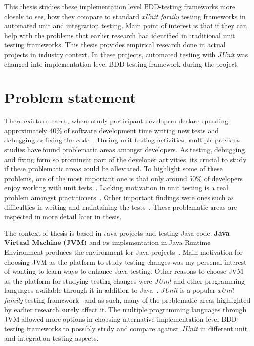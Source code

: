 This thesis studies these implementation level BDD-testing frameworks more closely to see, how they compare to
standard \textit{xUnit family} testing frameworks in automated unit and integration testing.
Main point of interest is that if they can help with the problems that earlier research
had identified in traditional unit testing frameworks. This thesis provides empirical research done in actual projects in industry context.
In these projects, automated testing with \textit{JUnit} was changed into implementation level BDD-testing framework during the project.

\section{Problem statement}
There exists research, where study participant developers declare spending approximately 40\% of software development time
writing new tests and debugging or fixing the code~\cite{daka2014survey}. During unit testing activities, multiple previous
studies have found problematic areas amongst developers. As testing, debugging and fixing form so prominent part of the
developer activities, its crucial to study if these problematic areas could be alleviated.
To highlight some of these problems, one of the most important one is
that only around 50\% of developers enjoy working with unit tests~\cite{daka2014survey}.
Lacking motivation in unit testing is a real problem amongst practitioners~\cite{runeson2006survey}. Other important findings
were ones such as difficulties in writing and maintaining the tests~\cite{daka2014survey}. These problematic areas are inspected
in more detail later in thesis.

The context of thesis is based in Java-projects and testing Java-code. \textbf{Java Virtual Machine (JVM)} and its
implementation in Java Runtime Environment produces the environment for Java-projects~\cite{wiki:jvm}.
Main motivation for choosing JVM as the platform to study testing changes was my personal interest of wanting to learn ways to enhance
Java testing.
Other reasons to choose JVM as the platform for studying testing changes were \textit{JUnit} and other programming
languages available through it in addition to Java~\cite{wiki:jvm}. \textit{JUnit} is a popular \textit{xUnit family} testing framework~\cite{hamill2004unit} and as such,
many of the problematic areas highlighted by earlier research surely affect it. The multiple programming languages through JVM
allowed more options in choosing alternative implementation level BDD-testing frameworks to possibly study and compare
against \textit{JUnit} in different unit and integration testing aspects.



